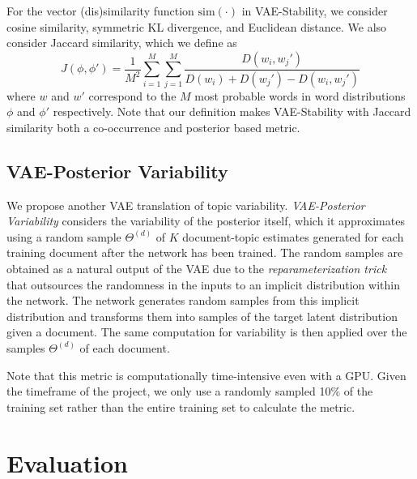 \documentclass[10pt]{article}
\begin{document}
For the vector (dis)similarity function $\textrm{sim}(\cdot)$ in VAE-Stability, we consider cosine similarity, symmetric KL divergence, and Euclidean distance. We also consider Jaccard similarity, which we define as
\[
J(\phi,\phi') = \frac{1}{M^2}\sum_{i=1}^M\sum_{j=1}^{M}\frac{D(w_i,w_j')}{D(w_i)+D(w_j')-D(w_i,w_j')}
\]
where $w$ and $w'$ correspond to the $M$ most probable words in word distributions $\phi$ and $\phi'$ respectively. Note that our definition makes VAE-Stability with Jaccard similarity both a co-occurrence and posterior based metric.

\subsection{VAE-Posterior Variability}

We propose another VAE translation of topic variability. \textit{VAE-Posterior Variability} considers the variability of the posterior itself, which it approximates using a random sample $\Theta^{(d)}$ of $K$ document-topic estimates generated for each training document after the network has been trained. The random samples are obtained as a natural output of the VAE due to the \textit{reparameterization trick}~\cite{Kingma:2013} that outsources the randomness in the inputs to an implicit distribution within the network. The network generates random samples from this implicit distribution and transforms them into samples of the target latent distribution given a document. The same computation for variability is then applied over the samples $\Theta^{(d)}$ of each document.

Note that this metric is computationally time-intensive even with a GPU. Given the timeframe of the project, we only use a randomly sampled 10\% of the training set rather than the entire training set to calculate the metric.

\section{Evaluation}
\end{document}
